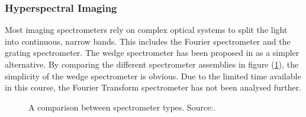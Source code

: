 \subsubsection*{Hyperspectral Imaging}
Most imaging spectrometers rely on complex optical systems to split the light into continuous, narrow bands. This includes the Fourier spectrometer and the grating spectrometer. The wedge spectrometer has been proposed in \cite{puschell1999a} as a simpler alternative. By comparing the different spectrometer assemblies in figure (\ref{fig:spec_compare}), the simplicity of the wedge spectrometer is obvious. Due to the limited time available in this course, the Fourier Transform spectrometer has not been analysed further.

\begin{figure}[htb!]
    \centering
    \captionsetup[subfigure]{width=0.25\textwidth}
    \caption{A comparison between spectrometer types. Source:\cite{puschell1999a}.}\label{fig:spec_compare}
\end{figure}

